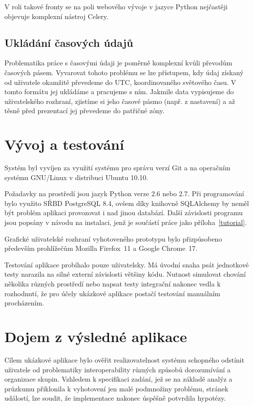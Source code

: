 \documentclass[12pt,oneside,final]{fithesis2}
\begin{document}
V roli takové fronty se na poli webového vývoje v jazyce Python nejčastěji objevuje komplexní nástroj Celery.

\subsection{Ukládání časových údajů}
Problematika práce s časovými údaji je poměrně komplexní kvůli převodům časových pásem. Vyvarovat tohoto problému se lze přístupem, kdy údaj získaný od uživatele okamžitě převedeme do UTC, koordinovaného světového času. V tomto formátu jej ukládáme a pracujeme s ním. Jakmile data vypisujeme do uživatelského rozhraní, zjistíme si jeho časové pásmo (např. z nastavení) a až těsně před prezentací jej převedeme do patřičné zóny.



\section{Vývoj a testování}
Systém byl vyvíjen za využití systému pro správu verzí Git a na operačním systému GNU/Linux v distribuci Ubuntu 10.10.

Požadavky na prostředí jsou jazyk Python verze 2.6 nebo 2.7. Při programování bylo využito SŘBD PostgreSQL 8.4, ovšem díky knihovně SQLAlchemy by neměl být problém aplikaci provozovat i nad jinou databází. Další závislosti programu jsou popsány v návodu na instalaci, jenž je součástí práce jako příloha~\ref{tutorial}.

Grafické uživatelské rozhraní vyhotoveného prototypu bylo přizpůsobeno především prohlížečům Mozilla Firefox~11 a Google Chrome~17.

Testování aplikace probíhalo pouze uživatelsky. Má úvodní snaha psát jednotkové testy narazila na silné externí závislosti většiny kódu. Nutnost simulovat chování několika různých prostředí nebo napsat testy integrační nakonec vedla k rozhodnutí, že pro účely ukázkové aplikace postačí testování manuálním procházením.



\section{Dojem z výsledné aplikace}
Cílem ukázkové aplikace bylo ověřit realizovatelnost systému schopného odstínit uživatele od problematiky interoperability různých způsobů dorozumívání a organizace skupin. Vzhledem k specifikaci zadání, jež se na základě analýz a průzkumu přiklonila k vyhotovení jen malé podmnožiny problému, stránek událostí, lze soudit, že implementace nakonec úspěšně potvrdila hypotézy.
\end{document}
